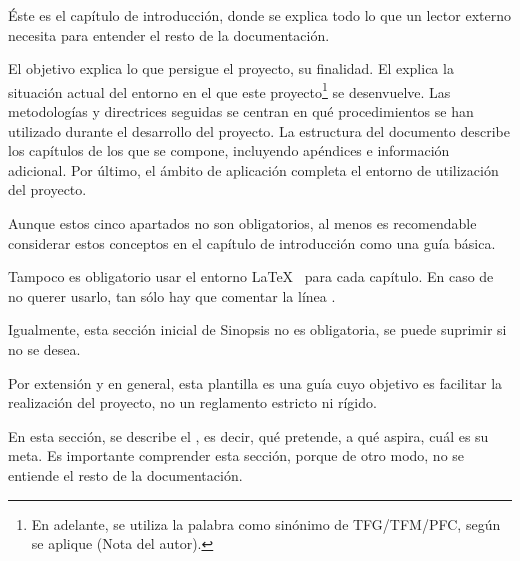 
\minitoc

\begin{sinopsis}
\label{sec:intro:sinop}
  Éste es el capítulo de introducción, donde se explica todo lo que un lector externo necesita para entender el resto de la documentación.
  
  El objetivo explica lo que persigue el proyecto, su finalidad.\nli
  El  explica la situación actual del entorno en el que este proyecto\footnote{En adelante, se utiliza la palabra  como sinónimo de TFG/TFM/PFC, según se aplique (Nota del autor).} se desenvuelve.\nli
  Las metodologías y directrices seguidas se centran en qué procedimientos se han utilizado durante el desarrollo del proyecto.\nli
  La estructura del documento describe los capítulos de los que se compone, incluyendo apéndices e información adicional.\nli
  Por último, el ámbito de aplicación completa el entorno de utilización del proyecto.
  
  Aunque estos cinco apartados no son obligatorios, al menos es recomendable considerar estos conceptos en el capítulo de introducción como una guía básica.
  
  Tampoco es obligatorio usar el entorno \LaTeX\  para cada capítulo.\nli
  En caso de no querer usarlo, tan sólo hay que comentar la línea .
  
  Igualmente, esta sección inicial de Sinopsis no es obligatoria, se puede suprimir si no se desea.
  
  Por extensión y en general, esta plantilla es una guía cuyo objetivo es facilitar la realización del proyecto, no un reglamento estricto ni rígido.
\end{sinopsis}
 
\label{sec:intro:obj}
  En esta sección, se describe el , es decir, qué pretende, a qué aspira, cuál es su meta.\nli
  Es importante comprender esta sección, porque de otro modo, no se entiende el resto de la documentación.

